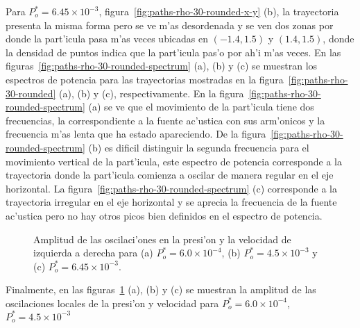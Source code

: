 Para  $P^\ast_o = 6.45 \times 10^{-3}$, figura~\ref{fig:paths-rho-30-rounded-x-y} (b), la trayectoria presenta la misma
forma pero se ve m'as desordenada y se ven dos zonas por donde la part'icula pasa m'as veces ubicadas en
$(-1.4,1.5)$ y  $(1.4,1.5)$, donde la densidad de puntos indica que la part'icula pas'o por ah'i m'as veces. 
En las figuras~\ref{fig:paths-rho-30-rounded-spectrum} (a), (b) y (c) se muestran los espectros de potencia para 
las trayectorias mostradas en la figura~\ref{fig:paths-rho-30-rounded} (a), (b) y (c), respectivamente. 
En la figura~\ref{fig:paths-rho-30-rounded-spectrum} (a) se ve que el movimiento de la part'icula tiene dos frecuencias, la
correspondiente a la fuente ac'ustica con sus arm'onicos y la frecuencia m'as lenta que ha estado apareciendo. 
De la figura~\ref{fig:paths-rho-30-rounded-spectrum} (b) es dificil distinguir la segunda frecuencia para el movimiento
vertical de la part'icula, este espectro de potencia corresponde a la trayectoria donde la part'icula comienza a oscilar
de manera regular en el eje horizontal. La figura~\ref{fig:paths-rho-30-rounded-spectrum} (c) corresponde a la trayectoria
irregular en el eje horizontal y se aprecia la frecuencia de la fuente ac'ustica pero no hay otros 
picos bien definidos en el espectro de potencia. 
\begin{figure}
 
\hskip -3.1cm
 

% 
% 

 
\hskip -3.1cm
 


 
\hskip -3.1cm
 
%
%
%
\caption{\label{fig:potentials-rounded-rho-30}
Amplitud de las oscilaci'ones en la presi'on y la velocidad de izquierda a derecha para
(a) $P_o^\ast = 6.0\times 10^{-4} $,
(b) $P_o^\ast = 4.5\times 10^{-3}$
y
(c) $P_o^\ast = 6.45\times 10^{-3}$.
}
\end{figure}
Finalmente, en las figuras~\ref{fig:potentials-rounded-rho-30} (a), (b) y (c) se muestran la amplitud de las oscilaciones  locales
de la presi'on y velocidad para $P_o^\ast = 6.0\times 10^{-4} $, $P_o^\ast = 4.5\times 10^{-3}$
